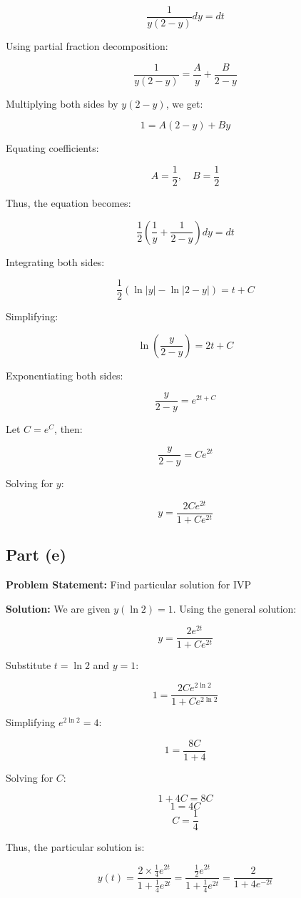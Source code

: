 \documentclass[12pt, letterpaper]{article}
\begin{document}
\[
\frac{1}{y(2 - y)} dy = dt
\]

Using partial fraction decomposition:

\[
\frac{1}{y(2 - y)} = \frac{A}{y} + \frac{B}{2 - y}
\]

Multiplying both sides by \( y(2 - y) \), we get:

\[
1 = A(2 - y) + By
\]

Equating coefficients:

\[
A = \frac{1}{2}, \quad B = \frac{1}{2}
\]

Thus, the equation becomes:

\[
\frac{1}{2} \left( \frac{1}{y} + \frac{1}{2 - y} \right) dy = dt
\]

Integrating both sides:

\[
\frac{1}{2} \left( \ln |y| - \ln |2 - y| \right) = t + C
\]

Simplifying:

\[
\ln \left( \frac{y}{2 - y} \right) = 2t + C
\]

Exponentiating both sides:

\[
\frac{y}{2 - y} = e^{2t + C}
\]

Let \( C = e^{C} \), then:

\[
\frac{y}{2 - y} = C e^{2t}
\]

Solving for \( y \):

\[
y = \frac{2C e^{2t}}{1 + C e^{2t}}
\]

\subsection*{Part (e)}
\textbf{Problem Statement:} Find particular solution for IVP

\textbf{Solution:} We are given \( y(\ln 2) = 1 \). Using the general solution:

\[
y = \frac{2 e^{2t}}{1 + C e^{2t}}
\]

Substitute \( t = \ln 2 \) and \( y = 1 \):

\[
1 = \frac{2C e^{2\ln 2}}{1 + C e^{2\ln 2}}
\]

Simplifying \( e^{2\ln 2} = 4 \):

\[
1 = \frac{8C}{1 + 4}
\]

Solving for \( C \):

\[
1 + 4C = 8C
\]
\[
1 = 4C
\]
\[
C = \frac{1}{4}
\]

Thus, the particular solution is:

\[
y(t) = \frac{2 \times \frac{1}{4} e^{2t}}{1 + \frac{1}{4} e^{2t}} = \frac{\frac{1}{2} e^{2t}}{1 + \frac{1}{4} e^{2t}} = \frac{2}{1 + 4e^{-2t}}
\]
\end{document}
